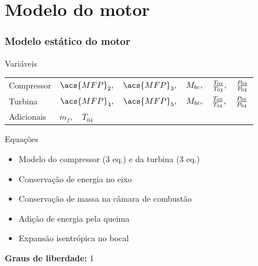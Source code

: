 \documentclass[aspectratio=1610]{beamer}
\begin{document}
\section{Modelo do motor} %
\begin{frame}
    \frametitle{Modelo estático do motor}

    \begin{block}{Variáveis}
        \begin{tabular}{ll}
            Compressor & $ \acs{MFP}_2, \quad \acs{MFP}_3, \quad M_{bc}, \quad \tr{03}{02}, \quad \pr{03}{02}$ \\
            Turbina    & $ \acs{MFP}_4, \quad \acs{MFP}_5, \quad M_{bt}, \quad \tr{05}{04}, \quad \pr{05}{04}$ \\
            Adicionais & $\dot{m}_f, \quad T_{04}$ \\
        \end{tabular}
    \end{block}
    \vfill
    \begin{block}{Equações}
    \begin{itemize}
        \item Modelo do compressor (3 eq.) e da turbina (3 eq.)
        \item Conservação de energia no eixo
        \item Conservação de massa na câmara de combustão
        \item Adição de energia pela queima
        \item Expansão isentrópica no bocal 
    \end{itemize}
    \end{block}

    \textbf{Graus de liberdade:} 1 
\end{frame}
\end{document}
